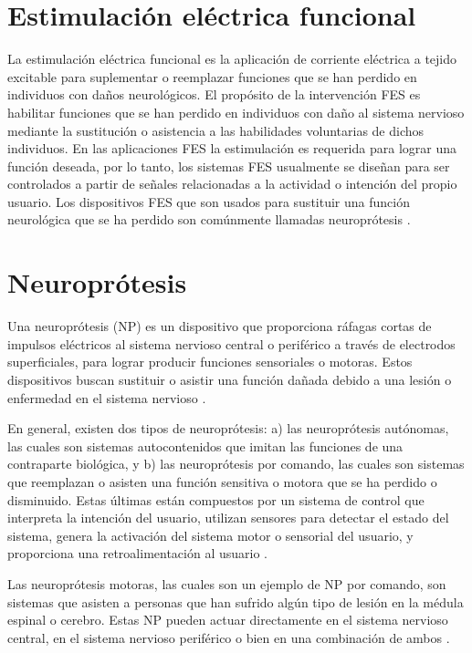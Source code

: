 
\section{Estimulación eléctrica funcional}
La estimulación eléctrica funcional es la aplicación de corriente eléctrica a tejido excitable para suplementar o reemplazar funciones que se han perdido en individuos con daños neurológicos. El propósito de la intervención FES es habilitar funciones que se han perdido en individuos con daño al sistema nervioso mediante la sustitución o asistencia a las habilidades voluntarias de dichos individuos. En las aplicaciones FES la estimulación es requerida para lograr una función deseada, por lo tanto, los sistemas FES usualmente se diseñan para ser controlados a partir de señales relacionadas a la actividad o intención del propio usuario. Los dispositivos FES que son usados para sustituir una función neurológica que se ha perdido son comúnmente llamadas neuroprótesis \cite{Peckham2005}.

\section{Neuroprótesis}
Una neuroprótesis (NP) es un dispositivo que proporciona ráfagas cortas de impulsos eléctricos al sistema nervioso central o periférico a través de electrodos superficiales, para lograr producir funciones sensoriales o motoras. Estos dispositivos buscan sustituir o asistir una función dañada debido a una lesión o enfermedad en el sistema nervioso \cite{Popovic2008}\cite{Popovic2015}.

En general, existen dos tipos de neuroprótesis: a) las neuroprótesis autónomas, las cuales son sistemas autocontenidos que imitan las funciones de una contraparte biológica, y b) las neuroprótesis por comando, las cuales son sistemas que reemplazan o asisten una función sensitiva o motora que se ha perdido o disminuido. Estas últimas están compuestos por un sistema de control que interpreta la intención del usuario, utilizan sensores para detectar el estado del sistema, genera la activación del sistema motor o sensorial del usuario, y proporciona una retroalimentación al usuario \cite{Popovic2015}.

Las neuroprótesis motoras, las cuales son un ejemplo de NP por comando, son sistemas que asisten a personas que han sufrido algún tipo de lesión en la médula espinal o cerebro. Estas NP pueden actuar directamente en el sistema nervioso central, en el sistema nervioso periférico o bien en una combinación de ambos \cite{Popovic2015}.

